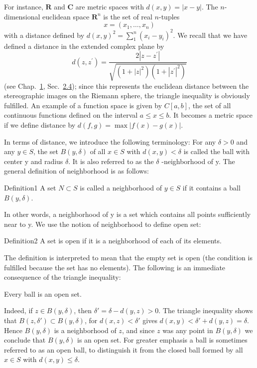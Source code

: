 For instance, $\mathbf{R}$ and $\mathbf{C}$ are metric spaces with $d(x,y) = |x - y|$. The $n$-dimensional euclidean space $\mathbf{R}^n$ is the set of real $n$-tuples
\begin{equation*}
x = (x _ {1}, \dots , x _ {n})
\end{equation*}
with a distance defined by $d(x, y)^2 = \sum_{1}^{n} (x_i - y_i)^2$. We recall that we have defined a distance in the extended complex plane by
\begin{equation*}
d (z, z ^ {\prime}) = \frac {2 | z - z ^ {\prime} |}{\sqrt {(1 + | z | ^ {2}) (1 + | z ^ {\prime} | ^ {2})}}
\end{equation*}
(see Chap.~\hyperref[chap:1]{1}, Sec.~\hyperref[sec:1.2.4]{2.4}); since this represents the euclidean distance between the stereographic images on the Riemann sphere, the triangle inequality is obviously fulfilled. An example of a function space is given by $C[a,b]$, the set of all continuous functions defined on the interval $a \leq x \leq b$. It becomes a metric space if we define distance by $d(f,g) = \max |f(x) - g(x)|$.

In terms of distance, we introduce the following terminology: For any $\delta > 0$ and any $y \in S$, the set $B(y, \delta)$ of all $x \in S$ with $d(x, y) < \delta$ is called
the ball with center y and radius $\delta$. It is also referred to as the $\delta$ -neighborhood of y. The general definition of neighborhood is as follows:

\begin{originalstatement}{Definition}{1}\label{def:3.1}
A set $N \subset S$ is called a neighborhood of $y \in S$ if it contains a ball $B(y, \delta)$.
\end{originalstatement}
In other words, a neighborhood of y is a set which contains all points sufficiently near to y. We use the notion of neighborhood to define open set:

\begin{originalstatement}{Definition}{2}\label{def:3.2}
A set is open if it is a neighborhood of each of its elements.
\end{originalstatement}
The definition is interpreted to mean that the empty set is open (the condition is fulfilled because the set has no elements). The following is an immediate consequence of the triangle inequality:

Every ball is an open set.

Indeed, if $z \in B(y,\delta)$, then $\delta' = \delta - d(y,z) > 0$. The triangle inequality shows that $B(z,\delta') \subset B(y,\delta)$, for $d(x,z) < \delta'$ gives $d(x,y) < \delta' + d(y,z) = \delta$. Hence $B(y,\delta)$ is a neighborhood of $z$, and since $z$ was any point in $B(y,\delta)$ we conclude that $B(y,\delta)$ is an open set. For greater emphasis a ball is sometimes referred to as an open ball, to distinguish it from the closed ball formed by all $x \in S$ with $d(x,y) \leq \delta$.

